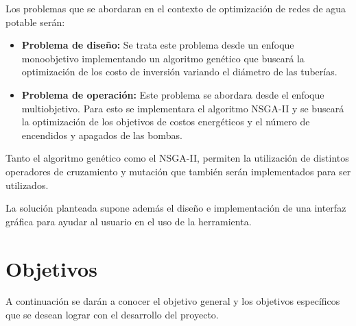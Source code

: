 \documentclass[11pt,letterpaper]{article}
\begin{document}
Los problemas que se abordaran en el contexto de optimización de redes de agua potable serán:
\begin{itemize}
	\item \textbf{Problema de diseño:} Se trata este problema desde un enfoque monoobjetivo implementando un algoritmo genético que buscará la optimización de los costo de inversión variando el diámetro de las tuberías.  
	\item \textbf{Problema de operación:} Este problema se abordara desde el enfoque multiobjetivo. Para esto se implementara el algoritmo NSGA-II y se buscará la optimización de los objetivos de costos energéticos y el número de encendidos y apagados de las bombas.
\end{itemize}

Tanto el algoritmo genético como el NSGA-II, permiten la utilización de distintos operadores de cruzamiento y mutación que también serán implementados para ser utilizados. 

La solución planteada supone además el diseño e implementación de una interfaz gráfica para ayudar al usuario en el uso de la herramienta.

\section{Objetivos}

A continuación se darán a conocer el objetivo general y los objetivos específicos que se desean lograr con el desarrollo del proyecto.
\end{document}
